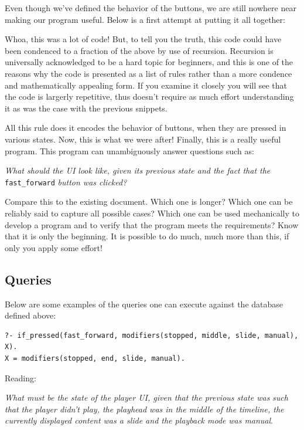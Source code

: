 \documentclass[11pt]{article}
\begin{document}
   Even though we've defined the behavior of the buttons, we are still nowhere
near making our program useful.  Below is a first attempt at putting it all
together:

Whoa, this was a lot of code! But, to tell you the truth, this code could
have been condenced to a fraction of the above by use of recursion.
Recursion is universally acknowledged to be a hard topic for beginners, and
this is one of the reasons why the code is presented as a list of rules
rather than a more condence and mathematically appealing form.  If you
examine it closely you will see that the code is largerly repetitive, thus
doesn't require as much effort understanding it as was the case with the
previous snippets.

All this rule does it encodes the behavior of buttons, when they are pressed in
various states.  Now, this is what we were after!  Finally, this is a really
useful program.  This program can unambiguously answer questions such as:

\emph{What should the UI look like, given its previous state and the fact}
\emph{that the} \texttt{fast\_forward} \emph{button was clicked?}

Compare this to the existing document.  Which one is longer? Which one can be
reliably said to capture all possible cases?  Which one can be used mechanically
to develop a program and to verify that the program meets the requirements?
Know that it is only the beginning.  It is possible to do much, much more than
this, if only you apply some effort!
\subsection{Queries}
\label{sec-2-4}

Below are some examples of the queries one can execute against the database
defined above:

\begin{verbatim}
?- if_pressed(fast_forward, modifiers(stopped, middle, slide, manual), X).
X = modifiers(stopped, end, slide, manual).
\end{verbatim}

Reading:

\emph{What must be the state of the player UI, given that the previous state was}
\emph{such that the player didn't play, the playhead was in the middle of the}
\emph{timeline, the currently displayed content was a slide and the playback mode}
\emph{was manual}.
\end{document}
